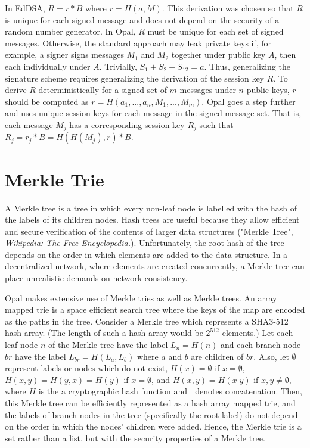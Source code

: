 \documentclass[10pt,twocolumn]{article}
\begin{document}
In EdDSA, $R = r * B$ where $r = H(a, M)$.  This derivation was chosen so that $R$ is unique for each signed message and does not depend on the security of a random number generator.  In Opal, $R$ must be unique for each set of signed messages.  Otherwise, the standard approach may leak private keys if, for example, a signer signs messages $M_1$ and $M_2$ together under public key $A$, then each individually under $A$.  Trivially, $S_1 + S_2 - S_{12} = a$.  Thus, generalizing the signature scheme requires generalizing the derivation of the session key $R$.  To derive $R$ deterministically for a signed set of $m$ messages under $n$ public keys, $r$ should be computed as $r = H(a_1, ..., a_n, M_1, ..., M_m)$.  Opal goes a step further and uses unique session keys for each message in the signed message set.  That is, each message $M_j$ has a corresponding session key $R_j$ such that $R_j = r_j * B = H(H(M_j), r) * B$.

\section{Merkle Trie}

A Merkle tree is a tree in which every non-leaf node is labelled with the hash of the labels of its children nodes. Hash trees are useful because they allow efficient and secure verification of the contents of larger data structures ("Merkle Tree", {\em Wikipedia: The Free Encyclopedia.}).  Unfortunately, the root hash of the tree depends on the order in which elements are added to the data structure.  In a decentralized network, where elements are created concurrently, a Merkle tree can place unrealistic demands on network consistency.

Opal makes extensive use of Merkle tries as well as Merkle trees.  An array mapped trie is a space efficient search tree where the keys of the map are encoded as the paths in the tree.  Consider a Merkle tree which represents a SHA3-512 hash array.  (The length of such a hash array would be $2^{512}$ elements.)  Let each leaf node $n$ of the Merkle tree have the label $L_n = H(n)$ and each branch node $br$ have the label $L_{br} = H(L_a,L_b)$ where $a$ and $b$ are children of $br$.  Also, let $\emptyset$ represent labels or nodes which do not exist, $H(x) = \emptyset$ if $x = \emptyset$, $H(x, y) = H(y, x) = H(y)$ if $x = \emptyset$, and $H(x,y) = H(x | y)$ if $x,y \ne \emptyset$, where $H$ is the a cryptographic hash function and $|$ denotes concatenation.  Then, this Merkle tree can be efficiently represented as a hash array mapped trie, and the labels of branch nodes in the tree (specifically the root label) do not depend on the order in which the nodes' children were added.  Hence, the Merkle trie is a set rather than a list, but with the security properties of a Merkle tree.
\end{document}
